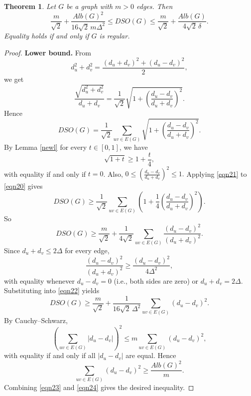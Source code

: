 \documentclass{article}
\newtheorem{theorem}{Theorem}
\theoremstyle{definition}
\begin{document}
\begin{theorem}\label{new:Alb-upper}
Let $G$ be a graph with $m>0$ edges. Then
\[
\frac{m}{\sqrt{2}}+\frac{Alb(G)^2}{16\sqrt{2}\,m \Delta^2}\le DSO(G) \le \frac{m}{\sqrt{2}} + \frac{Alb(G)}{4\sqrt{2}\,\delta}.
\]
Equality holds if and only if $G$ is regular.
\end{theorem}
\begin{proof}
\textbf{Lower bound.}
From
\[
d_u^2+d_v^2=\frac{(d_u+d_v)^2+(d_u-d_v)^2}{2},
\]
we get
\begin{equation}\label{eqn19}
\frac{\sqrt{d_u^2+d_v^2}}{d_u+d_v}
=
\frac{1}{\sqrt{2}}
\sqrt{1+\left(\frac{d_u-d_v}{d_u+d_v}\right)^2}.
\end{equation}
Hence
\begin{equation}\label{eqn20}
DSO(G)
=
\frac{1}{\sqrt{2}}
\sum_{uv\in E(G)}
\sqrt{1+\left(\frac{d_u-d_v}{d_u+d_v}\right)^2}.
\end{equation}
By Lemma \ref{newl} for every $t\in[0,1]$, we have
\begin{equation}\label{eqn21}
\sqrt{1+t}\ge 1+\frac{t}{4}, 
\end{equation}
with equality if and only if $t=0$.
Also,
$
0\le \left(\frac{d_u-d_v}{d_u+d_v}\right)^2 \le 1.
$
Applying \eqref{eqn21} to \eqref{eqn20} gives
\[
DSO(G)
\ge 
\frac{1}{\sqrt{2}}
\sum_{uv\in E(G)}
\left(
1+\frac{1}{4}
\left(\frac{d_u-d_v}{d_u+d_v}\right)^2
\right).
\]
So
\begin{equation}\label{eqn22}
DSO(G)
\ge 
\frac{m}{\sqrt{2}}
+
\frac{1}{4\sqrt{2}}
\sum_{uv\in E(G)}
\frac{(d_u-d_v)^2}{(d_u+d_v)^2}. 
\end{equation}
Since $d_u+d_v\le 2\Delta$ for every edge,
\[
\frac{(d_u-d_v)^2}{(d_u+d_v)^2}
\ge 
\frac{(d_u-d_v)^2}{4\Delta^2},
\]
with equality whenever $d_u-d_v=0$ (i.e., both sides are zero) or $d_u+d_v=2\Delta$. Substituting into \eqref{eqn22} yields
\begin{equation}\label{eqn23}
DSO(G)
\ge 
\frac{m}{\sqrt{2}}
+
\frac{1}{16\sqrt{2}\,\Delta^2}
\sum_{uv\in E(G)} (d_u-d_v)^2. 
\end{equation}
By Cauchy–Schwarz,
\[
\left(\sum_{uv\in E(G)} |d_u-d_v|\right)^2
\le 
m\sum_{uv\in E(G)} (d_u-d_v)^2,
\]
with equality if and only if all $|d_u-d_v|$ are equal.
Hence
\begin{equation}\label{eqn24}
\sum_{uv\in E(G)} (d_u-d_v)^2
\ge 
\frac{Alb(G)^2}{m}. 
\end{equation}
Combining \eqref{eqn23} and \eqref{eqn24} gives the desired inequality.


\end{proof}
\end{document}
